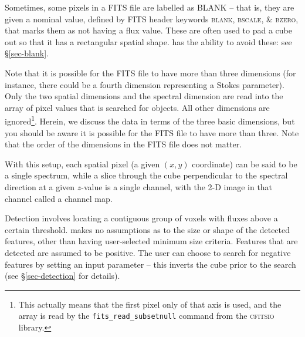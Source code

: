 Sometimes, some pixels in a FITS file are labelled as BLANK -- that
is, they are given a nominal value, defined by FITS header keywords
\textsc{blank, bscale, \& bzero}, that marks them as not having a flux
value. These are often used to pad a cube out so that it has a
rectangular spatial shape. \duchamp has the ability to avoid these:
see \S\ref{sec-blank}.

Note that it is possible for the FITS file to have more than three
dimensions (for instance, there could be a fourth dimension
representing a Stokes parameter). Only the two spatial dimensions and
the spectral dimension are read into the array of pixel values that is
searched for objects. All other dimensions are ignored\footnote{This
actually means that the first pixel only of that axis is used, and the
array is read by the \texttt{fits\_read\_subsetnull} command from the
\textsc{cfitsio} library.}. Herein, we discuss the data in terms of
the three basic dimensions, but you should be aware it is possible for
the FITS file to have more than three. Note that the order of the
dimensions in the FITS file does not matter.

With this setup, each spatial pixel (a given $(x,y)$ coordinate) can
be said to be a single spectrum, while a slice through the cube
perpendicular to the spectral direction at a given $z$-value is a
single channel, with the 2-D image in that channel called a channel
map.

Detection involves locating a contiguous group of voxels with fluxes
above a certain threshold. \duchamp makes no assumptions as to the
size or shape of the detected features, other than having
user-selected minimum size criteria. Features that are detected are
assumed to be positive. The user can choose to search for negative
features by setting an input parameter -- this inverts the cube prior
to the search (see \S\ref{sec-detection} for details).


